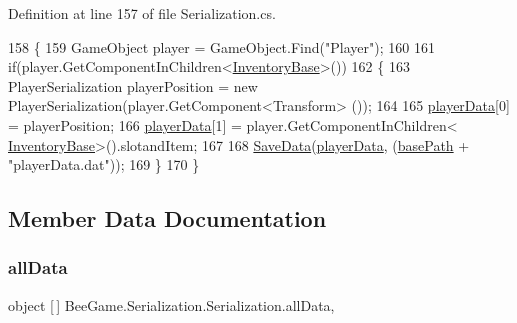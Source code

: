 Definition at line 157 of file Serialization.\+cs.


\begin{DoxyCode}
158         \{
159             GameObject player = GameObject.Find(\textcolor{stringliteral}{"Player"});
160 
161             \textcolor{keywordflow}{if}(player.GetComponentInChildren<\hyperlink{class_bee_game_1_1_inventory_1_1_inventory_base}{InventoryBase}>())
162             \{
163                 PlayerSerialization playerPosition = \textcolor{keyword}{new} PlayerSerialization(player.GetComponent<Transform>
      ());
164 
165                 \hyperlink{class_bee_game_1_1_serialization_1_1_serialization_a4c53353a34466434389b58c351edf08d}{playerData}[0] = playerPosition;
166                 \hyperlink{class_bee_game_1_1_serialization_1_1_serialization_a4c53353a34466434389b58c351edf08d}{playerData}[1] = player.GetComponentInChildren<
      \hyperlink{class_bee_game_1_1_inventory_1_1_inventory_base}{InventoryBase}>().slotandItem;
167 
168                 \hyperlink{class_bee_game_1_1_serialization_1_1_serialization_a5e84293340234b478d4ef6bd8168260f}{SaveData}(\hyperlink{class_bee_game_1_1_serialization_1_1_serialization_a4c53353a34466434389b58c351edf08d}{playerData}, (\hyperlink{class_bee_game_1_1_serialization_1_1_serialization_ab90922fcf58a723ce591487507356310}{basePath} + \textcolor{stringliteral}{"playerData.dat"}));
169             \}
170         \}
\end{DoxyCode}


\subsection{Member Data Documentation}
\mbox{\label{class_bee_game_1_1_serialization_1_1_serialization_ad79bc6234bf57644744e131bfc1c164d}} 
\subsubsection{\texorpdfstring{all\+Data}{allData}}
{\footnotesize\ttfamily object \mbox{[}$\,$\mbox{]} Bee\+Game.\+Serialization.\+Serialization.\+all\+Data\hspace{0.3cm}{\ttfamily [static]}, {\ttfamily [private]}}



